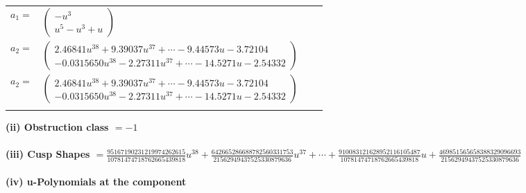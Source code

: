 \documentclass[1p]{elsarticle_modified}
\theoremstyle{definition}
\begin{document}
\begin{tabular}{m{7pt} m{180pt} m{7pt} m{180pt} }
\flushright $a_{1}=$&$\begin{pmatrix}- u^3\\u^5- u^3+u\end{pmatrix}$ \\
\flushright $a_{2}=$&$\begin{pmatrix}2.46841 u^{38}+9.39037 u^{37}+\cdots-9.44573 u-3.72104\\-0.0315650 u^{38}-2.27311 u^{37}+\cdots-14.5271 u-2.54332\end{pmatrix}$\\ \flushright $a_{2}=$&$\begin{pmatrix}2.46841 u^{38}+9.39037 u^{37}+\cdots-9.44573 u-3.72104\\-0.0315650 u^{38}-2.27311 u^{37}+\cdots-14.5271 u-2.54332\end{pmatrix}$\\&\end{tabular}
\flushleft \textbf{(ii) Obstruction class $= -1$}\\~\\
\flushleft \textbf{(iii) Cusp Shapes $= \frac{95167190231219974262615}{10781474718762665439818} u^{38}+\frac{642665286688782560331753}{21562949437525330879636} u^{37}+\cdots+\frac{910083121628952116105487}{10781474718762665439818} u+\frac{469851565658388329096693}{21562949437525330879636}$}\\~\\
\newpage\renewcommand{\arraystretch}{1}
\flushleft \textbf{(iv) u-Polynomials at the component}\newline \\
\end{document}
